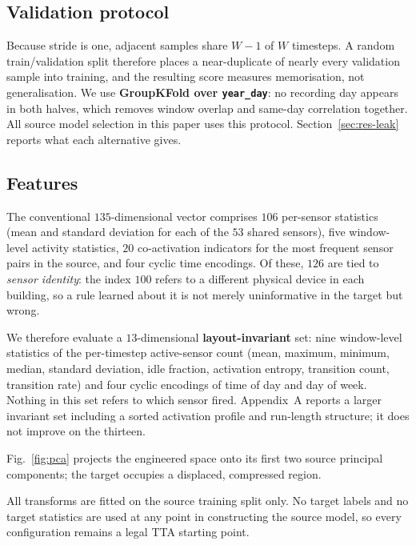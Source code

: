 \documentclass[a4paper,fleqn]{cas-dc}
\begin{document}
\subsection{Validation protocol}
\label{sec:method-split}

Because stride is one, adjacent samples share $W-1$ of $W$ timesteps. A random
train/validation split therefore places a near-duplicate of nearly every validation sample
into training, and the resulting score measures memorisation, not generalisation.
We use \textbf{GroupKFold over \texttt{year\_day}}: no recording day appears in both
halves, which removes window overlap and same-day correlation together. All source model
selection in this paper uses this protocol. Section~\ref{sec:res-leak} reports what each
alternative gives.

\subsection{Features}
\label{sec:method-feat}

The conventional $135$-dimensional vector comprises $106$ per-sensor statistics (mean and
standard deviation for each of the $53$ shared sensors), five window-level activity
statistics, $20$ co-activation indicators for the most frequent sensor pairs in the
source, and four cyclic time encodings. Of these, $126$ are tied to \emph{sensor
identity}: the index $100$ refers to a different physical device in each building, so a
rule learned about it is not merely uninformative in the target but wrong.

We therefore evaluate a $13$-dimensional \textbf{layout-invariant} set: nine window-level
statistics of the per-timestep active-sensor count (mean, maximum, minimum, median,
standard deviation, idle fraction, activation entropy, transition count, transition rate)
and four cyclic encodings of time of day and day of week. Nothing in this set refers to
which sensor fired. Appendix~A reports a larger invariant set including a sorted
activation profile and run-length structure; it does not improve on the thirteen.

Fig.~\ref{fig:pca} projects the engineered space onto its first two source principal
components; the target occupies a displaced, compressed region.

All transforms are fitted on the source training split only. No target labels and no
target statistics are used at any point in constructing the source model, so every
configuration remains a legal TTA starting point.
\end{document}

